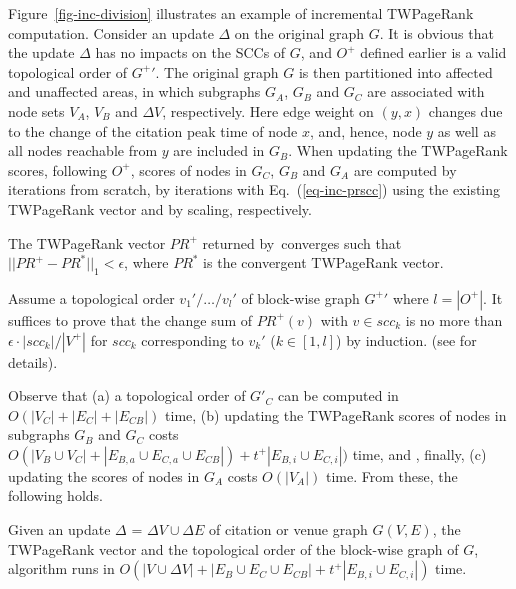 \begin{example} \label{eg-layer-dag}
Figure~\ref{fig-inc-division} illustrates an example of incremental TWPageRank computation. Consider an update $\Delta$ on the original graph $G$.
%
It is obvious that the update $\Delta$ has no impacts on the SCCs of $G$, and $O^+$ defined earlier is a valid topological order of $G^+{'}$.
%
The original graph $G$ is then partitioned into affected and unaffected areas, in which subgraphs $G_A$, $G_B$ and $G_C$ are associated with node sets $V_A$, $V_B$ and $\Delta V$, respectively. Here edge weight on $(y, x)$ changes due to the change of the citation peak time of node $x$, and, hence, node $y$ as well as all nodes reachable from $y$ are included in $G_B$.
%
When updating the TWPageRank scores, following $O^+$, scores of nodes in $G_C$, $G_B$ and $G_A$ are computed by iterations from scratch, by iterations with Eq.~(\ref{eq-inc-prscc}) using the existing TWPageRank vector and by scaling, respectively.
\end{example}

\begin{theorem}
\label{lemma-subgraphA}
The TWPageRank vector $PR^+$ returned by~\inctwprscc converges such that $||PR^+-PR^{*}||_1 < \epsilon$, where $PR^{*}$ is the convergent TWPageRank vector.
\end{theorem}

\begin{proofSketch}
Assume a topological order $v_1'/\dots/v_{l}'$ of block-wise graph $G^+{'}$ where $l=|O^+|$. It suffices to prove that the change sum of $PR^+(v)$ with $v\in scc_k$ is no more than $\epsilon\cdot |scc_k|/|V^+|$ for $scc_k$ corresponding to $v_k'$ ($k\in [1,l]$) by induction.
(see \cite{SARank-full} for details).
\end{proofSketch}



Observe that (a) a topological order of $G'_C$ can be computed in $O(|V_C|+|E_C|+|E_{CB}|)$ time,
(b) updating the TWPageRank scores of nodes in subgraphs $G_B$ and $G_C$ costs $O(|V_B\cup V_C|+|E_{B,a}\cup E_{C,a}\cup E_{CB}|)+t^+|E_{B,i}\cup E_{C,i}|)$ time, and , finally, (c) updating the scores of nodes in $G_A$ costs $O(|V_A|)$ time. From these, the following holds.


\begin{prop} \label{lemma-inc-citation-comp}
Given an update $\Delta$ = $\Delta V\cup\Delta E$ of citation or venue graph $G(V,E)$, the TWPageRank vector and the topological order of the
block-wise graph of $G$, algorithm \inctwprscc runs in $O(|V\cup \Delta V|+|E_B\cup E_C\cup E_{CB}|+t^+|E_{B,i}\cup E_{C,i}|)$ time.
\end{prop}



